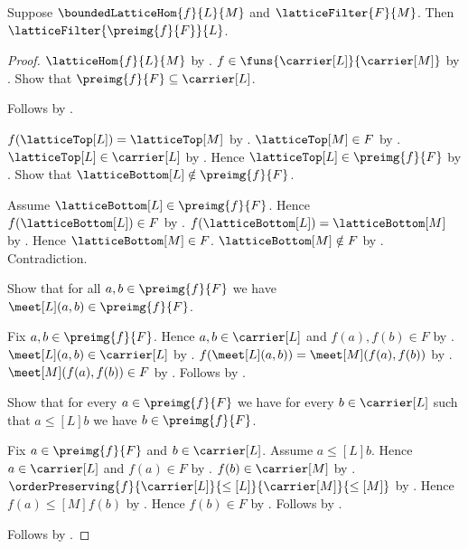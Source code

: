 \begin{theorem}\label{bounded_lattice_hom_preimage_lattice_filter}
    Suppose $\boundedLatticeHom{f}{L}{M}$ and
        $\latticeFilter{F}{M}$.
    Then $\latticeFilter{\preimg{f}{F}}{L}$.
\end{theorem}
\begin{proof}
    $\latticeHom{f}{L}{M}$ by
        .
    $f\in\funs{\carrier[L]}{\carrier[M]}$ by
        .
    Show that $\preimg{f}{F}\subseteq\carrier[L]$.
    \begin{subproof}
        Follows by
            .
    \end{subproof}
    $f(\latticeTop[L])=\latticeTop[M]$ by
        .
    $\latticeTop[M]\in F$ by .
    $\latticeTop[L]\in\carrier[L]$ by .
    Hence $\latticeTop[L]\in\preimg{f}{F}$ by
        .
    Show that $\latticeBottom[L]\notin\preimg{f}{F}$.
    \begin{subproof}
        Assume $\latticeBottom[L]\in\preimg{f}{F}$.
        Hence $f(\latticeBottom[L])\in F$ by
            .
        $f(\latticeBottom[L])=\latticeBottom[M]$ by
            .
        Hence $\latticeBottom[M]\in F$.
        $\latticeBottom[M]\notin F$ by
            .
        Contradiction.
    \end{subproof}
    Show that for all $a,b\in\preimg{f}{F}$ we have
        $\meet[L](a,b)\in\preimg{f}{F}$.
    \begin{subproof}
        Fix $a,b\in\preimg{f}{F}$.
        Hence $a,b\in\carrier[L]$ and $f(a),f(b)\in F$ by
            .
        $\meet[L](a,b)\in\carrier[L]$ by
            .
        $f(\meet[L](a,b))=\meet[M](f(a),f(b))$ by
            .
        $\meet[M](f(a),f(b))\in F$ by
            .
        Follows by
            .
    \end{subproof}
    Show that for every $a\in\preimg{f}{F}$ we have
        for every $b\in\carrier[L]$ such that
            $a\mathrel{\leq[L]}b$ we have $b\in\preimg{f}{F}$.
    \begin{subproof}
        Fix $a\in\preimg{f}{F}$ and $b\in\carrier[L]$.
        Assume $a\mathrel{\leq[L]}b$.
        Hence $a\in\carrier[L]$ and $f(a)\in F$ by
            .
        $f(b)\in\carrier[M]$ by .
        $\orderPreserving
            {f}{\carrier[L]}{\leq[L]}
            {\carrier[M]}{\leq[M]}$ by
            .
        Hence $f(a)\mathrel{\leq[M]}f(b)$ by
            .
        Hence $f(b)\in F$ by .
        Follows by
            .
    \end{subproof}
    Follows by .
\end{proof}
